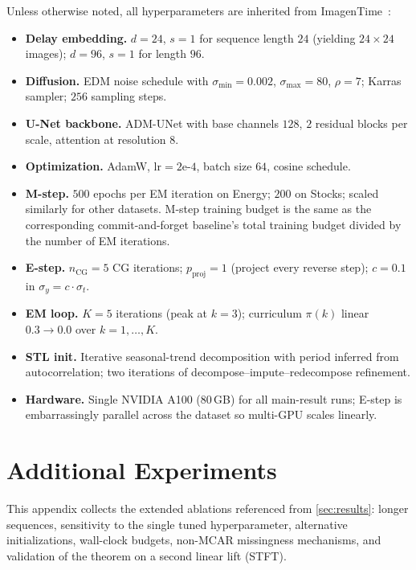 \documentclass{article}
\theoremstyle{plain}
\theoremstyle{definition}
\theoremstyle{remark}
\begin{document}
Unless otherwise noted, all hyperparameters are inherited from ImagenTime~\citep{naiman2024imagentime}:
\begin{itemize}
\setlength{\itemsep}{0pt}
\item \textbf{Delay embedding.} $d = 24$, $s = 1$ for sequence length $24$ (yielding $24 \times 24$ images); $d = 96$, $s = 1$ for length $96$.
\item \textbf{Diffusion.} EDM noise schedule with $\sigma_{\min} = 0.002$, $\sigma_{\max} = 80$, $\rho = 7$; Karras sampler; $256$ sampling steps.
\item \textbf{U-Net backbone.} ADM-UNet with base channels $128$, $2$ residual blocks per scale, attention at resolution $8$.
\item \textbf{Optimization.} AdamW, $\mathrm{lr} = 2\text{e-}4$, batch size $64$, cosine schedule.
\item \textbf{M-step.} $500$ epochs per EM iteration on Energy; $200$ on Stocks; scaled similarly for other datasets. M-step training budget is the same as the corresponding commit-and-forget baseline's total training budget divided by the number of EM iterations.
\item \textbf{E-step.} $n_{\mathrm{CG}} = 5$ CG iterations; $p_{\mathrm{proj}} = 1$ (project every reverse step); $c = 0.1$ in $\sigma_y = c \cdot \sigma_t$.
\item \textbf{EM loop.} $K = 5$ iterations (peak at $k = 3$); curriculum $\pi(k)$ linear $0.3 \to 0.0$ over $k = 1, \ldots, K$.
\item \textbf{STL init.} Iterative seasonal-trend decomposition with period inferred from autocorrelation; two iterations of decompose--impute--redecompose refinement.
\item \textbf{Hardware.} Single NVIDIA A100 (80\,GB) for all main-result runs; E-step is embarrassingly parallel across the dataset so multi-GPU scales linearly.
\end{itemize}


\section{Additional Experiments}
\label{app:additional-exp}

This appendix collects the extended ablations referenced from \cref{sec:results}: longer sequences, sensitivity to the single tuned hyperparameter, alternative initializations, wall-clock budgets, non-MCAR missingness mechanisms, and validation of the theorem on a second linear lift (STFT).
\end{document}
